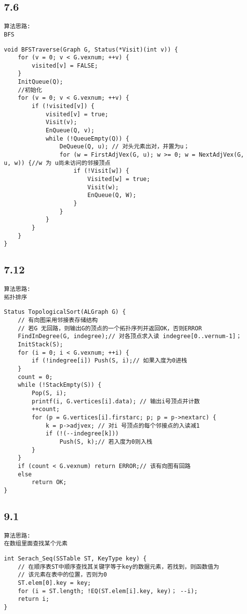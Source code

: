 \subsection{7.6}
\begin{lstlisting}[basicstyle=\small\ttfamily, caption={}, numbers=none]
算法思路:
BFS
\end{lstlisting}
\begin{lstlisting}[basicstyle=\small\ttfamily, caption={}, numbers=none]
void BFSTraverse(Graph G, Status(*Visit)(int v)) {
	for (v = 0; v < G.vexnum; ++v) {
		visited[v] = FALSE;
	}
	InitQueue(Q);
	//初始化
	for (v = 0; v < G.vexnum; ++v) {
		if (!visited[v]) {
			visited[v] = true;
			Visit(v);
			EnQueue(Q, v);
			while (!QueueEmpty(Q)) {
				DeQueue(Q, u); // 对头元素出对，并置为u；
				for (w = FirstAdjVex(G, u); w >= 0; w = NextAdjVex(G, u, w)) {//w 为 u尚未访问的邻接顶点
					if (!Visit[w]) {
						Visited[w] = true;
						Visit(w);
						EnQueue(Q, W);
					}
				}
			}
		}
	}
}

\end{lstlisting}

\subsection{7.12}
\begin{lstlisting}[basicstyle=\small\ttfamily, caption={}, numbers=none]
算法思路:
拓扑排序
\end{lstlisting}
\begin{lstlisting}[basicstyle=\small\ttfamily, caption={}, numbers=none]
Status TopologicalSort(ALGraph G) {
	// 有向图采用邻接表存储结构
	// 若G 无回路，则输出G的顶点的一个拓扑序列并返回OK，否则ERROR
	FindInDegree(G, indegree);// 对各顶点求入读 indegree[0..vernum-1]；
	InitStack(S);
	for (i = 0; i < G.vexnum; ++i) {
		if (!indegree[i]) Push(S, i);// 如果入度为0进栈
	}
	count = 0;
	while (!StackEmpty(S)) {
		Pop(S, i);
		printf(i, G.vertices[i].data); // 输出i号顶点并计数
		++count;
		for (p = G.vertices[i].firstarc; p; p = p->nextarc) {
			k = p->adjvex; // 对i 号顶点的每个邻接点的入读减1
			if (!(--indegree[k]))
				Push(S, k);// 若入度为0则入栈
		}
	}
	if (count < G.vexnum) return ERROR;// 该有向图有回路
	else
		return OK;
}

\end{lstlisting}

\subsection{9.1}
\begin{lstlisting}[basicstyle=\small\ttfamily, caption={}, numbers=none]
算法思路:
在数组里面查找某个元素
\end{lstlisting}
\begin{lstlisting}[basicstyle=\small\ttfamily, caption={}, numbers=none]
int Serach_Seq(SSTable ST, KeyType key) {
	// 在顺序表ST中顺序查找其关键字等于key的数据元素，若找到，则函数值为
	// 该元素在表中的位置，否则为0
	ST.elem[0].key = key;
	for (i = ST.length; !EQ(ST.elem[i].key, key)； --i);
	return i;
}
\end{lstlisting}

